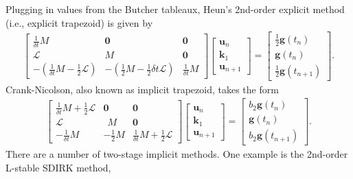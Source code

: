 \documentclass[a4paper,10pt]{article}
\begin{document}
Plugging in values from the Butcher tableaux, Heun's 2nd-order explicit method (i.e., explicit trapezoid) is given by 
%
\begin{align*}
\begin{bmatrix} \tfrac{1}{\delta t}M & \mathbf{0}  & \mathbf{0}  \\
	\mathcal{L} & M & \mathbf{0} \\
	-\left(\tfrac{1}{\delta t}M - \frac{1}{2}\mathcal{L}\right) & -\left(\frac{1}{2}M - \frac{1}{2}\delta t\mathcal{L}\right) & \tfrac{1}{\delta t}M \end{bmatrix}
	\begin{bmatrix} \mathbf{u}_n \\ \mathbf{k}_1 \\ \mathbf{u}_{n+1} \end{bmatrix} = 
	\begin{bmatrix} \frac{1}{2}\mathbf{g}(t_{n}) \\ \mathbf{g}(t_{n}) \\ \frac{1}{2}\mathbf{g}(t_{n+1}) \end{bmatrix}.
\end{align*}
%
Crank-Nicolson, also known as implicit trapezoid, takes the form
%
\begin{align*}
\begin{bmatrix} \tfrac{1}{\delta t}M + \frac{1}{2}\mathcal{L} & \mathbf{0}  & \mathbf{0}  \\
	\mathcal{L} & ~~M  & \mathbf{0} \\
	-\tfrac{1}{\delta t}M& -\frac{1}{2}M & \tfrac{1}{\delta t}M + \frac{1}{2}\mathcal{L} \end{bmatrix}
	\begin{bmatrix} \mathbf{u}_n \\ \mathbf{k}_1 \\ \mathbf{u}_{n+1} \end{bmatrix} = 
	\begin{bmatrix} b_2\mathbf{g}(t_{n}) \\ \mathbf{g}(t_{n}) \\ b_2\mathbf{g}(t_{n+1}) \end{bmatrix}.
\end{align*}
%
There are a number of two-stage implicit methods. One example is the 2nd-order L-stable SDIRK method, 
%
\end{document}

